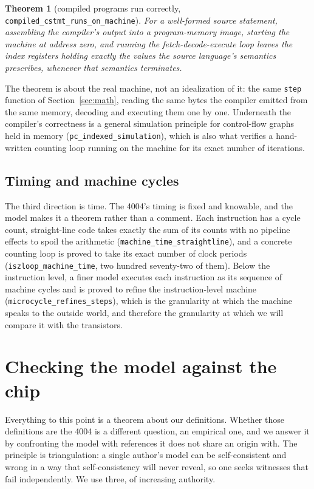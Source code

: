 \documentclass[11pt]{amsart}
\theoremstyle{plain}
\newtheorem{theorem}{Theorem}[section]
\theoremstyle{definition}
\newcommand{\code}[1]{\texttt{#1}}
\begin{document}
\begin{theorem}[compiled programs run correctly, \code{compiled\_cstmt\_runs\_on\_machine}]\label{thm:compiler}
For a well-formed source statement, assembling the compiler's output into a program-memory image, starting the machine at address zero, and running the fetch-decode-execute loop leaves the index registers holding exactly the values the source language's semantics prescribes, whenever that semantics terminates.
\end{theorem}

The theorem is about the real machine, not an idealization of it: the same \code{step} function of Section~\ref{sec:math}, reading the same bytes the compiler emitted from the same memory, decoding and executing them one by one. Underneath the compiler's correctness is a general simulation principle for control-flow graphs held in memory (\code{pc\_indexed\_simulation}), which is also what verifies a hand-written counting loop running on the machine for its exact number of iterations.

\subsection{Timing and machine cycles}

The third direction is time. The 4004's timing is fixed and knowable, and the model makes it a theorem rather than a comment. Each instruction has a cycle count, straight-line code takes exactly the sum of its counts with no pipeline effects to spoil the arithmetic (\code{machine\_time\_straightline}), and a concrete counting loop is proved to take its exact number of clock periods (\code{iszloop\_machine\_time}, two hundred seventy-two of them). Below the instruction level, a finer model executes each instruction as its sequence of machine cycles and is proved to refine the instruction-level machine (\code{microcycle\_refines\_steps}), which is the granularity at which the machine speaks to the outside world, and therefore the granularity at which we will compare it with the transistors.

\section{Checking the model against the chip}\label{sec:validation}

Everything to this point is a theorem about our definitions. Whether those definitions are the 4004 is a different question, an empirical one, and we answer it by confronting the model with references it does not share an origin with. The principle is triangulation: a single author's model can be self-consistent and wrong in a way that self-consistency will never reveal, so one seeks witnesses that fail independently. We use three, of increasing authority.
\end{document}
